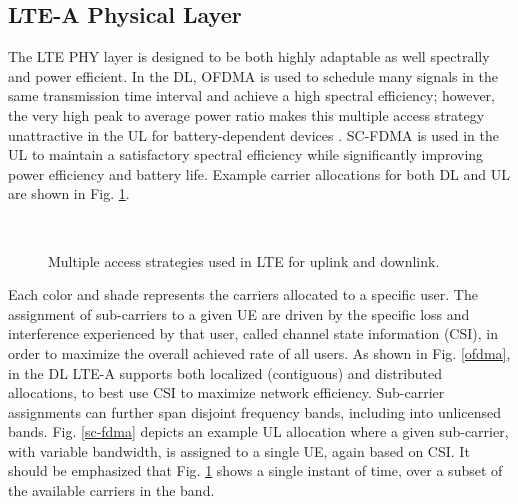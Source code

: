 \subsection{LTE-A Physical Layer}
\label{lte-phy}
The LTE PHY layer is designed to be both highly adaptable as well spectrally and power efficient.  In the DL, OFDMA is used to schedule many signals in the same transmission time interval and achieve a high spectral efficiency; however, the very high peak to average power ratio makes this multiple access strategy unattractive in the UL for battery-dependent devices \cite{tr36201}\cite{tr36211}.  SC-FDMA is used in the UL to maintain a satisfactory spectral efficiency while significantly improving power efficiency and battery life. Example carrier allocations for both DL and UL are shown in Fig. \ref{lte:of-sc-fdma}.
\begin{figure}[!ht] 	
	\\
	\caption{Multiple access strategies used in LTE for uplink and downlink.}
	\label{lte:of-sc-fdma}
\end{figure}
Each color and shade represents the carriers allocated to a specific user.  The assignment of sub-carriers to a given UE are driven by the specific loss and interference experienced by that user, called channel state information (CSI), in order to maximize the overall achieved rate of all users.  As shown in Fig. \ref{ofdma}, in the DL LTE-A supports both localized (contiguous) and distributed allocations, to best use CSI to maximize network efficiency. Sub-carrier assignments can further span disjoint frequency bands, including into unlicensed bands.  Fig. \ref{sc-fdma} depicts an example UL allocation where a given sub-carrier, with variable bandwidth, is assigned to a single UE, again based on CSI.  It should be emphasized that Fig. \ref{lte:of-sc-fdma} shows a single instant of time, over a subset of the available carriers in the band.

